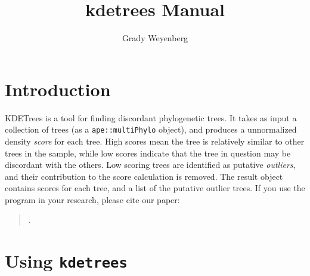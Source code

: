 \documentclass{article}
\title{kdetrees Manual}
\author{Grady Weyenberg}
\begin{document}
\maketitle

\section{Introduction}
\label{sec:introduction}

KDETrees is a tool for finding discordant phylogenetic trees. It takes
as input a collection of trees (as a {\tt ape::multiPhylo} object),
and produces a unnormalized density \emph{score} for each tree. High
scores mean the tree is relatively similar to other trees in the
sample, while low scores indicate that the tree in question may be
discordant with the others. Low scoring trees are identified as
putative \emph{outliers}, and their contribution to the score
calculation is removed. The result object contains scores for each
tree, and a list of the putative outlier trees. If you use the program
in your research, please cite our paper:
\begin{quote}
  .
\end{quote}


\section{Using {\tt kdetrees}}
\label{sec:use}


\end{document}
